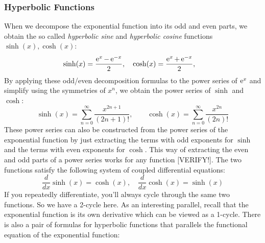 




\subsubsection{Hyperbolic Functions}
When we decompose the exponential function into its odd and even parts, we obtain the so called \emph{hyperbolic sine} and \emph{hyperbolic cosine} functions $\sinh(x), \cosh(x)$:
\begin{equation}
\sinh(x) =	\frac{\operatorname{\mathrm{e}}^x - \operatorname{\mathrm{e}}^{-x}}{2}, \quad	
\cosh(x) =	\frac{\operatorname{\mathrm{e}}^x + \operatorname{\mathrm{e}}^{-x}}{2}, \quad
\end{equation}
By applying these odd/even decomposition formulas to the power series of $\operatorname{\mathrm{e}}^x$ and simplify using the symmetries of $x^n$, we obtain the power series of $\sinh$ and $\cosh$: 
\begin{equation}
\sinh(x) = \sum_{n=0}^{\infty} \frac{x^{2n+1}}{(2n+1)!}, \qquad
\cosh(x) = \sum_{n=0}^{\infty} \frac{x^{2n}  }{(2n)!}
\end{equation}
These power series can also be constructed from the power series of the exponential function by just extracting the terms with odd exponents for $\sinh$ and the terms with even exponents for $\cosh$. This way of extracting the even and odd parts of a power series works for any function [VERIFY!]. The two functions satisfy the following system of coupled differential equations:
\begin{equation}
\frac{d}{dx} \sinh(x) = \cosh(x), \quad
\frac{d}{dx} \cosh(x) = \sinh(x)
\end{equation} 
If you repeatedly differentiate, you'll always cycle through the same two functions. So we have a 2-cycle here. As an interesting parallel, recall that the exponential function is its own derivative which can be viewed as a 1-cycle. There is also a pair of formulas for hyperbolic functions that parallels the functional equation of the exponential function:
